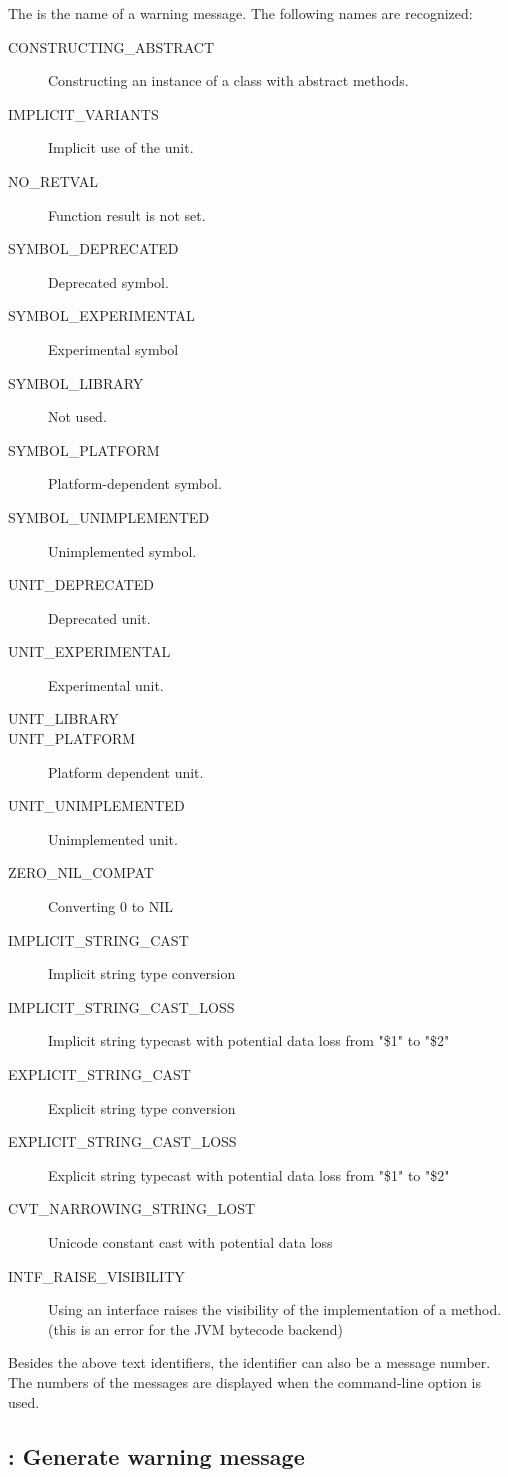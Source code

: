 The  is the name of a warning message. The following names
are recognized:
\begin{description}
\item[CONSTRUCTING\_ABSTRACT] Constructing an instance of a class with abstract methods.
\item[IMPLICIT\_VARIANTS] Implicit use of the  unit.
\item[NO\_RETVAL] Function result is not set.
\item[SYMBOL\_DEPRECATED] Deprecated symbol.
\item[SYMBOL\_EXPERIMENTAL] Experimental symbol
\item[SYMBOL\_LIBRARY] Not used.
\item[SYMBOL\_PLATFORM] Platform-dependent symbol. 
\item[SYMBOL\_UNIMPLEMENTED] Unimplemented symbol.
\item[UNIT\_DEPRECATED]  Deprecated unit.
\item[UNIT\_EXPERIMENTAL] Experimental unit.
\item[UNIT\_LIBRARY] 
\item[UNIT\_PLATFORM] Platform dependent unit.
\item[UNIT\_UNIMPLEMENTED] Unimplemented unit.
\item[ZERO\_NIL\_COMPAT] Converting 0 to NIL
\item[IMPLICIT\_STRING\_CAST] Implicit string type conversion
\item[IMPLICIT\_STRING\_CAST\_LOSS] Implicit string typecast with potential data loss from "\$1" to "\$2"
\item[EXPLICIT\_STRING\_CAST] Explicit string type conversion
\item[EXPLICIT\_STRING\_CAST\_LOSS] Explicit string typecast with potential data loss from "\$1" to "\$2"
\item[CVT\_NARROWING\_STRING\_LOST] Unicode constant cast with potential data loss
\item[INTF\_RAISE\_VISIBILITY] Using an interface raises the visibility of the implementation of a method.
(this is an error for the JVM bytecode backend)
\end{description}
Besides the above text identifiers, the identifier can also be a message number.
The numbers of the messages are displayed when the  command-line
option is used.

\subsection{ : Generate warning message}

